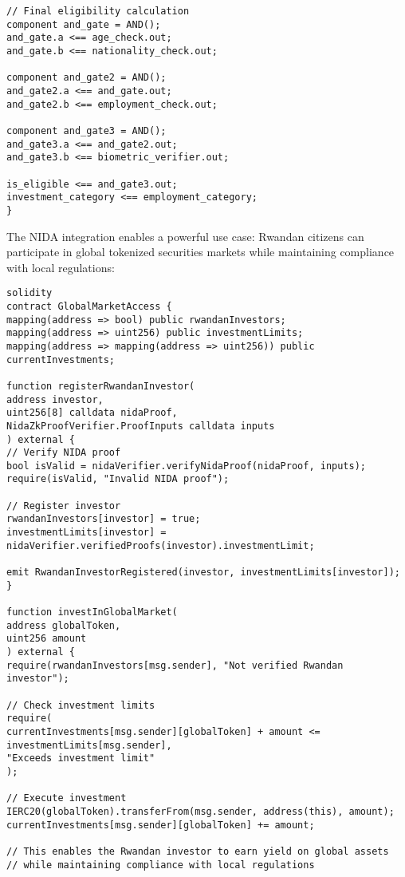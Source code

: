 \documentclass[12pt]{article}
\begin{document}
{{{\begin{lstlisting}
// Final eligibility calculation
component and_gate = AND();
and_gate.a <== age_check.out;
and_gate.b <== nationality_check.out;

component and_gate2 = AND();
and_gate2.a <== and_gate.out;
and_gate2.b <== employment_check.out;

component and_gate3 = AND();
and_gate3.a <== and_gate2.out;
and_gate3.b <== biometric_verifier.out;

is_eligible <== and_gate3.out;
investment_category <== employment_category;
}
\end{lstlisting}


The NIDA integration enables a powerful use case: Rwandan citizens can participate in global tokenized securities markets while maintaining compliance with local regulations:


\begin{lstlisting}
solidity
contract GlobalMarketAccess {
mapping(address => bool) public rwandanInvestors;
mapping(address => uint256) public investmentLimits;
mapping(address => mapping(address => uint256)) public currentInvestments;

function registerRwandanInvestor(
address investor,
uint256[8] calldata nidaProof,
NidaZkProofVerifier.ProofInputs calldata inputs
) external {
// Verify NIDA proof
bool isValid = nidaVerifier.verifyNidaProof(nidaProof, inputs);
require(isValid, "Invalid NIDA proof");

// Register investor
rwandanInvestors[investor] = true;
investmentLimits[investor] = nidaVerifier.verifiedProofs(investor).investmentLimit;

emit RwandanInvestorRegistered(investor, investmentLimits[investor]);
}

function investInGlobalMarket(
address globalToken,
uint256 amount
) external {
require(rwandanInvestors[msg.sender], "Not verified Rwandan investor");

// Check investment limits
require(
currentInvestments[msg.sender][globalToken] + amount <= investmentLimits[msg.sender],
"Exceeds investment limit"
);

// Execute investment
IERC20(globalToken).transferFrom(msg.sender, address(this), amount);
currentInvestments[msg.sender][globalToken] += amount;

// This enables the Rwandan investor to earn yield on global assets
// while maintaining compliance with local regulations


\end{lstlisting}}}}
\end{document}
